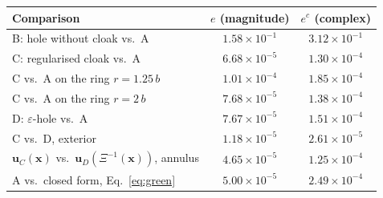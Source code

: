 \begin{tabular}{lcc}
\toprule
Comparison & $e$ (magnitude) & $e^{c}$ (complex) \\
\midrule
B: hole without cloak vs.\ A & $1.58\times 10^{-1}$ & $3.12\times 10^{-1}$ \\
C: regularised cloak vs.\ A & $6.68\times 10^{-5}$ & $1.30\times 10^{-4}$ \\
\quad C vs.\ A on the ring $r=1.25\,b$ & $1.01\times 10^{-4}$ & $1.85\times 10^{-4}$ \\
\quad C vs.\ A on the ring $r=2\,b$ & $7.68\times 10^{-5}$ & $1.38\times 10^{-4}$ \\
D: $\varepsilon$-hole vs.\ A & $7.67\times 10^{-5}$ & $1.51\times 10^{-4}$ \\
C vs.\ D, exterior & $1.18\times 10^{-5}$ & $2.61\times 10^{-5}$ \\
$\mathbf{u}_C(\mathbf{x})$ vs.\ $\mathbf{u}_D(\Xi^{-1}(\mathbf{x}))$, annulus & $4.65\times 10^{-5}$ & $1.25\times 10^{-4}$ \\
A vs.\ closed form, Eq.~\eqref{eq:green} & $5.00\times 10^{-5}$ & $2.49\times 10^{-4}$ \\
\bottomrule
\end{tabular}

